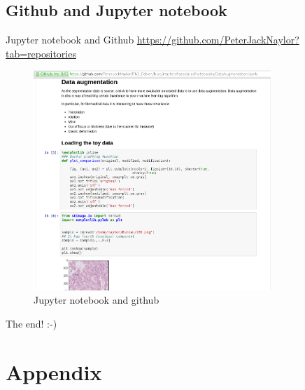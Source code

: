 \documentclass{beamer}
\begin{document}
\subsection{Github and Jupyter notebook}

\begin{frame}{Jupyter notebook and Github}
\url{https://github.com/PeterJackNaylor?tab=repositories}
\begin{figure}
\includegraphics[width=0.8\textwidth]{GitBook.png}
\caption{Jupyter notebook and github}
\end{figure}
\end{frame}


\begin{frame}[noframenumbering]
The end! :-)
\end{frame}
\section*{Appendix}
\end{document}

